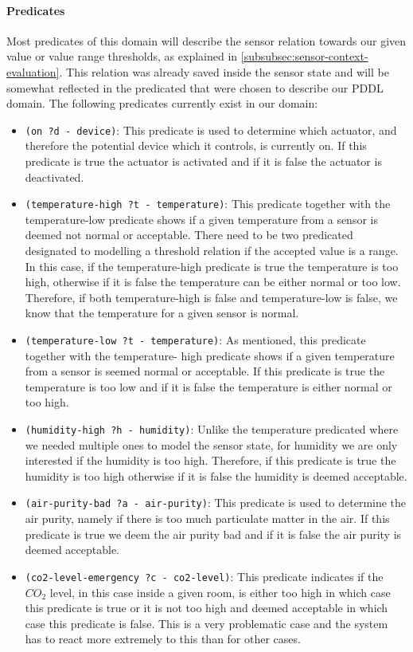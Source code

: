 \paragraph{Predicates}\label{para:predicates}
Most predicates of this domain will describe the sensor relation towards our given value or value range thresholds, as explained in \cref{subsubsec:sensor-context-evaluation}.
This relation was already saved inside the sensor state and will be somewhat reflected in the predicated that were chosen to describe our PDDL domain.
The following predicates currently exist in our domain:
\begin{itemize}
    \item \texttt{(on ?d - device)}: This predicate is used to determine which actuator, and therefore the potential device which it controls, is currently on.
    If this predicate is true the actuator is activated and if it is false the actuator is deactivated.
    \item \texttt{(temperature-high ?t - temperature)}: This predicate together with the temperature-low predicate shows if a given temperature from a sensor is deemed not normal or acceptable.
    There need to be two predicated designated to modelling a threshold relation if the accepted value is a range.
    In this case, if the temperature-high predicate is true the temperature is too high, otherwise if it is false the temperature can be either normal or too low.
    Therefore, if both temperature-high is false and temperature-low is false, we know that the temperature for a given sensor is normal.
    \item \texttt{(temperature-low ?t - temperature)}: As mentioned, this predicate together with the temperature- high predicate shows if a given temperature from a sensor is seemed normal or acceptable.
    If this predicate is true the temperature is too low and if it is false the temperature is either normal or too high.
    \item \texttt{(humidity-high ?h - humidity)}: Unlike the temperature predicated where we needed multiple ones to model the sensor state, for humidity we are only interested if the humidity is too high.
    Therefore, if this predicate is true the humidity is too high otherwise if it is false the humidity is deemed acceptable.
    \item \texttt{(air-purity-bad ?a - air-purity)}: This predicate is used to determine the air purity, namely if there is too much particulate matter in the air.
    If this predicate is true we deem the air purity bad and if it is false the air purity is deemed acceptable.
    \item \texttt{(co2-level-emergency ?c - co2-level)}: This predicate indicates if the $CO_2$ level, in this case inside a given room, is either too high in which case this predicate is true or it is not too high and deemed acceptable in which case this predicate is false.
    This is a very problematic case and the system has to react more extremely to this than for other cases.
\end{itemize}

